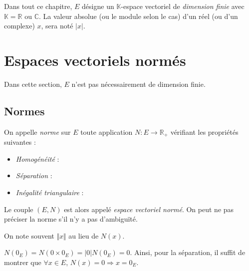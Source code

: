\documentclass[french,11pt,twoside]{VcCours}
\begin{document}

\tableofcontents
\separationTitre


Dans tout ce chapitre, $E$ désigne un $\mathbb{K}$-espace vectoriel de \emph{dimension finie} avec $\mathbb{K}= \mathbb{R}$ ou $\mathbb{C}$. La valeur absolue (ou le module selon le cas) d'un réel (ou d'un complexe) $x$, sera noté $\vert x \vert$.

 \section{Espaces vectoriels normés}
 
 Dans cette section, $E$ n'est pas nécessairement de dimension finie.
 
 \subsection{Normes}
 
 \begin{Definition}{} On appelle \emph{norme} sur $E$ toute application $N : E \rightarrow \mathbb{R}_+$ vérifiant les propriétés suivantes :
 
 \begin{itemize}
 \item \emph{Homogénéité} :
 
 \item \emph{Séparation} :
 
 \item \emph{Inégalité triangulaire} :
 
 \end{itemize}
 
Le couple $(E,N)$ est alors appelé \emph{espace vectoriel normé}. On peut ne pas préciser la norme s'il n'y a pas d'ambiguïté.
\end{Definition}
 
 \begin{Remarque}{} On note souvent $\Vert x \Vert$ au lieu de $N(x)$.
 \end{Remarque}
 
 \begin{Remarque}{} $N(0_E) = N(0 \times 0_E) = \vert 0 \vert N(0_E) = 0$. Ainsi, pour la séparation, il suffit de montrer que $\forall x \in E$, $N(x)=0\Longrightarrow x=0_E$.
 \end{Remarque}
 
\end{document}
